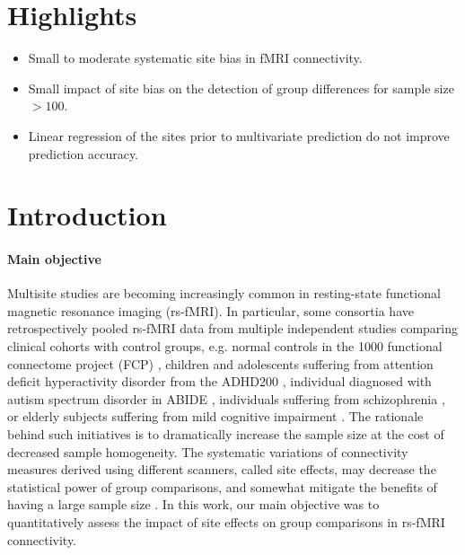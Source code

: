 \documentclass[authoryear]{elsarticle}
\begin{document}
\section*{Highlights}

\begin{itemize}
\item Small to moderate systematic site bias in fMRI connectivity.
\item Small impact of site bias on the detection of group differences for sample size $>100$.
\item Linear regression of the sites prior to multivariate prediction do not improve prediction accuracy.
\end{itemize}

\section{Introduction}

\paragraph{Main objective}
Multisite studies are becoming increasingly common in resting-state functional
magnetic resonance imaging (rs-fMRI). In particular, some consortia have
retrospectively pooled rs-fMRI data from multiple independent studies comparing
clinical cohorts with control groups, e.g. normal controls in the 1000
functional connectome project (FCP) \citep{Biswal2010}, children and adolescents
suffering from attention deficit hyperactivity disorder from the ADHD200
\citep{ADHD200,Fair2012}, individual diagnosed with autism spectrum disorder in
ABIDE \citep{Nielsen2013}, individuals suffering from schizophrenia
\citep{Cheng2015}, or elderly subjects suffering from mild cognitive impairment
\citep{Tam2015}. The rationale behind such initiatives is to dramatically
increase the sample size at the cost of decreased sample homogeneity. The
systematic variations of connectivity measures derived using different scanners,
called site effects, may decrease the statistical power of group comparisons,
and somewhat mitigate the benefits of having a large sample size
\citep{Brown2011,Jovicich2016}. In this work, our main objective was to
quantitatively assess the impact of site effects on group comparisons in rs-fMRI
connectivity.
\end{document}
